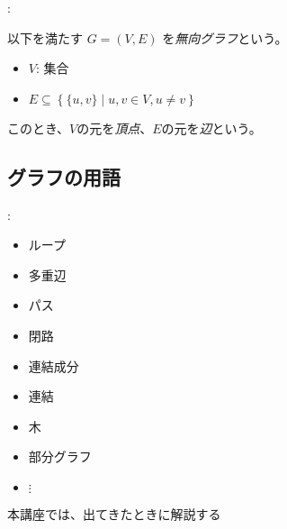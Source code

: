 \documentclass[dvipdfmx]{beamer}
\begin{document}
\begin{frame}{\insertsection: \insertsubsection}
  \begin{definition}
    以下を満たす $G = (V, E)$ を\emph{無向グラフ}という。
    \begin{itemize}
      \item $V$: 集合
      \item $E \subseteq \left\{ \{u, v\} \mid u, v \in V, u \neq v \right\}$
    \end{itemize}
    このとき、$V$の元を\emph{頂点}、$E$の元を\emph{辺}という。
  \end{definition}
\end{frame}

\subsection{グラフの用語}

\begin{frame}{\insertsection: \insertsubsection}
  \begin{block}{\insertsubsection}
    \begin{itemize}
      \item ループ
      \item 多重辺
      \item パス
      \item 閉路
      \item 連結成分
      \item 連結
      \item 木
      \item 部分グラフ
      \item $\vdots$
    \end{itemize}
    本講座では、出てきたときに解説する
  \end{block}
\end{frame}
\end{document}
